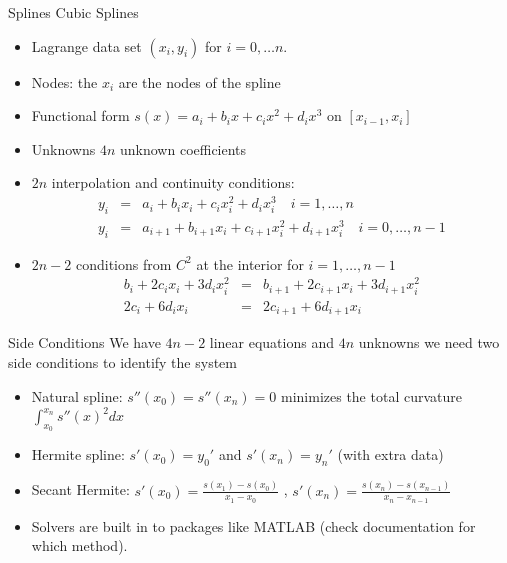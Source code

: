 \documentclass[xcolor=pdftex,dvipsnames,table,mathserif,aspectratio=169]{beamer}
\begin{document}
\begin{frame}{Splines}
Cubic Splines
\begin{itemize}
\item Lagrange data set $(x_i,y_i)$ for $i=0,\ldots n$.
\item Nodes: the $x_i$ are the nodes of the spline
\item Functional form $s(x) = a_i + b_i x + c_i x^2 + d_i x^3$ on $[x_{i-1},x_i]$
\item Unknowns $4n$ unknown coefficients
\item $2n$ interpolation and continuity conditions:
\begin{eqnarray*}
y_i &=& a_i + b_i x_i + c_i x_i^2 + d_i x_i^3 \quad i=1,\dots, n\\
y_i &=& a_{i+1} + b_{i+1} x_i + c_{i+1} x_i^2 + d_{i+1} x_i^3 \quad i=0,\ldots, n-1
\end{eqnarray*}
\item $2n - 2$ conditions from $C^2$ at the interior for $i=1,\ldots,n-1$
\begin{eqnarray*}
b_i + 2c_i x_i + 3 d_i x_i^2  &=& b_{i+1} + 2 c_{i+1} x_i + 3 d_{i+1}x_i^2\\ 
2c_i + 6d_i x_i &=& 2c_{i+1} + 6d_{i+1} x_i
\end{eqnarray*}
\end{itemize}
\end{frame}


\begin{frame}{Side Conditions}
We have $4n-2$ linear equations and $4n$ unknowns we need two side conditions to identify the system
\begin{itemize}
\item Natural spline: $s''(x_0) = s''(x_n) = 0$ minimizes the total curvature $\int_{x_0}^{x_n} s''(x)^2 dx$
\item Hermite spline: $s'(x_0) = y_0'$ and $s'(x_n) = y_n'$ (with extra data)
\item Secant Hermite: $s'(x_0) = \frac{s(x_1) - s(x_0)}{x_1-x_0}$ , $s'(x_n) = \frac{s(x_n) - s(x_{n-1})}{x_n-x_{n-1}}$
\item Solvers are built in to packages like MATLAB (check documentation for which method).
\end{itemize}
\end{frame}
\end{document}
